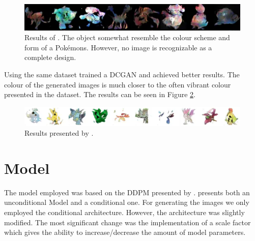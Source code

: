 \documentclass[12pt]{article}
\theoremstyle{plain}
\theoremstyle{definition}
\theoremstyle{remark}
\begin{document}
 \begin{figure}[h]
	\centering
	\includegraphics[width=1\linewidth]{src/Images/Kleiber_results}
	\caption[Results of \cite{Kleiber2020}]{Results of \cite{Kleiber2020}. The object somewhat resemble the colour scheme and form of a Pokémons. However, no image is recognizable as a complete design.}
	\label{fig:kleiberresults}
\end{figure}

Using the same dataset \cite{Chambel2022} trained a \ac{DCGAN} and achieved better results. The colour of the generated images is much closer to the often vibrant colour presented in the dataset. The results can be seen in Figure \ref{fig:chambelresults}.

\begin{figure}[h]
	\centering
	\includegraphics[width=1\linewidth]{src/Images/Chambel_results}
	\caption[Results presented by \cite{Chambel2022}]{Results presented by \cite{Chambel2022}.}
	\label{fig:chambelresults}
\end{figure}

\newpage

\section{Model}
\label{sec:model}
The model employed was based on the \ac{DDPM} presented by \cite{Ho2020}. \cite{Ho2020} presents both an unconditional Model and a conditional one. For generating the images we only employed the conditional architecture. However, the architecture was slightly modified. The most significant change was the implementation of a scale factor which gives the ability to increase/decrease the amount of model parameters. 
\end{document}
